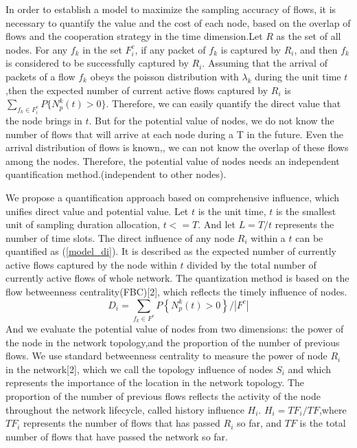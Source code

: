 \documentclass[conference]{IEEEtran}
\begin{document}
In order to establish a model to maximize the sampling accuracy of flows, it is necessary to quantify the value and the cost of each node, based on the overlap of flows and the cooperation strategy in the time dimension.Let $R$ as the set of all nodes.
For any $f_k$ in the set $F^c_i$, if any packet of $f_k$ is captured by $R_i$, and then $f_k$ is considered to be successfully captured by $R_i$.
Assuming that the arrival of packets of a flow $f_k$ obeys the poisson distribution with ${\lambda_{k}}$ during the unit time $t$,then the expected number of current active flows captured by $R_i$ is $\sum_{f_k \in F^c_i}{P\{N_p^k(t) > 0\}}$.
Therefore, we can easily quantify the direct value that the node brings in $t$.
But for the potential value of nodes, we do not know the number of flows that will arrive at each node during a T in the future. Even the arrival distribution of flows is known,, we can not know the overlap of these flows among the nodes. Therefore, the potential value of nodes needs an independent quantification method.(independent to other nodes).

We propose a quantification approach based on comprehensive influence, which unifies direct value and potential value.
Let $t$ is the unit time, $t$ is the smallest unit of sampling duration allocation, $t<=T$. And let $L = T/t$ represents the number of time slots.
The direct influence of any node $R_i$ within a $t$ can be quantified as (\ref{model_di}).
It is described as the expected number of currently active flows captured by the node within $t$ divided by the total number of currently active flows of whole network.
The quantization method is based on the flow betweenness centrality(FBC)[2], which reflects the timely influence of nodes.
\begin{equation}
D_i= \sum\limits_{{{f}_{k}}\in {{F}^{c}}}{P\left\{ N_{p}^{k}\left( t \right)>0 \right\}} /|F^c|
\label{model_di}
\end{equation}
And we evaluate the potential value of nodes from two dimensions: the power of the node in the network topology,and the proportion of the number of previous flows.
We use standard betweenness centrality to measure the power of node $R_i$ in the network[2], which we call the topology influence of nodes $S_i$ and which represents the importance of the location in the network topology.
The proportion of the number of previous flows reflects the activity of the node throughout the network lifecycle, called history influence $H_i$. 
$H_i=TF_i/TF$,where $TF_i$ represents the number of flows that has passed $R_i$ so far, and $TF$ is the total number of flows that have passed the network so far.
\end{document}
